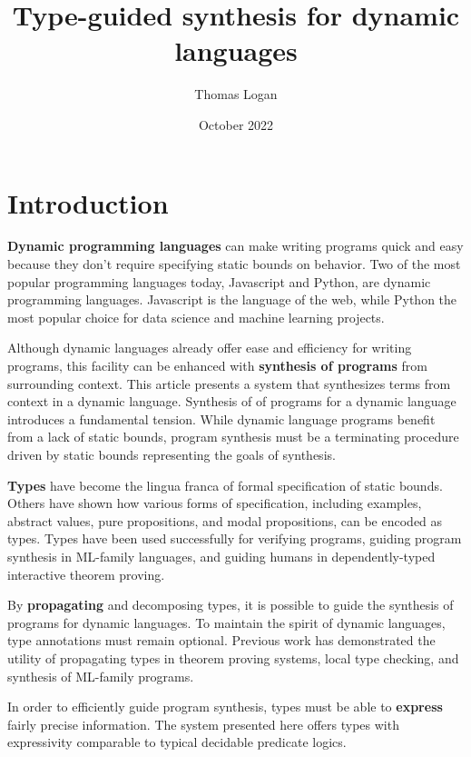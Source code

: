 \documentclass[sigplan,screen]{acmart}
\title{Type-guided synthesis for dynamic languages}
\author{Thomas Logan}
\date{October 2022}
\begin{document}
\maketitle

\section{Introduction}

\textbf{Dynamic programming languages} can make writing programs quick and easy 
because they don't require specifying static bounds on behavior.
Two of the most popular programming languages today, Javascript and Python,  are 
dynamic programming languages. 
Javascript is the language of the web, while Python the most popular choice
for data science and machine learning projects. 


Although dynamic languages already offer ease and efficiency for writing programs, 
this facility can be enhanced with \textbf{synthesis of programs} 
from surrounding context. 
This article presents a system that synthesizes terms from context 
in a dynamic language.
Synthesis of of programs for a dynamic language introduces a fundamental tension. 
While dynamic language programs benefit from a lack of static bounds, program synthesis
must be a terminating procedure driven by static bounds representing the goals of synthesis.   

\textbf{Types} have become the lingua franca of formal specification of static bounds.
Others have shown how various forms of specification, including examples, abstract values, 
pure propositions, and modal propositions, can be encoded as types.
Types have been used successfully for verifying programs, 
guiding program synthesis in ML-family languages, 
and guiding humans in dependently-typed interactive theorem proving. 

By \textbf{propagating} and decomposing types, 
it is possible to guide the synthesis of programs for dynamic languages.
To maintain the spirit of dynamic languages, type annotations must remain optional.
Previous work has demonstrated the utility of propagating types 
in theorem proving systems, local type checking, 
and synthesis of ML-family programs.

In order to efficiently guide program synthesis, 
types must be able to \textbf{express} fairly precise information. 
The system presented here offers types with 
expressivity comparable to typical decidable predicate logics. 
\end{document}
